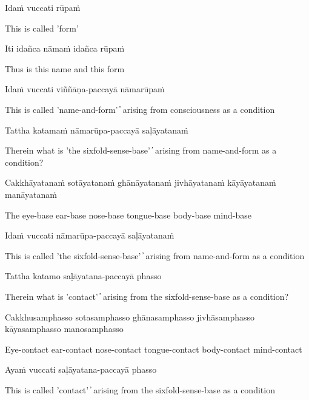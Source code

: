 Idaṁ vuccati rūpaṁ

\begin{cprenglish}
This is called 'form'
\end{cprenglish}

Iti idañca nāmaṁ idañca rūpaṁ

\begin{cprenglish}
Thus is this name and this form
\end{cprenglish}

Idaṁ vuccati viññāṇa-paccayā nāmarūpaṁ

\begin{cprenglish}
This is called 'name-and-form'  ̓  arising from consciousness as a condition
\end{cprenglish}

Tattha katamaṁ nāmarūpa-paccayā saḷāyatanaṁ

\begin{cprenglish}
Therein what is 'the sixfold-sense-base'  ̓  arising from name-and-form as a condition?
\end{cprenglish}

Cakkhāyatanaṁ sotāyatanaṁ ghānāyatanaṁ jivhāyatanaṁ kāyāyatanaṁ manāyatanaṁ

\begin{cprenglish}
The eye-base ear-base nose-base tongue-base body-base mind-base
\end{cprenglish}

Idaṁ vuccati nāmarūpa-paccayā saḷāyatanaṁ

\begin{cprenglish}
This is called 'the sixfold-sense-base'  ̓  arising from name-and-form as a condition
\end{cprenglish}

Tattha katamo saḷāyatana-paccayā phasso

\begin{cprenglish}
Therein what is 'contact'  ̓  arising from the sixfold-sense-base as a condition?
\end{cprenglish}

Cakkhusamphasso sotasamphasso ghānasamphasso jivhāsamphasso kāyasamphasso manosamphasso

\begin{cprenglish}
Eye-contact ear-contact nose-contact tongue-contact body-contact mind-contact
\end{cprenglish}

Ayaṁ vuccati saḷāyatana-paccayā phasso

\begin{cprenglish}
This is called 'contact'  ̓  arising from the sixfold-sense-base as a condition
\end{cprenglish}

